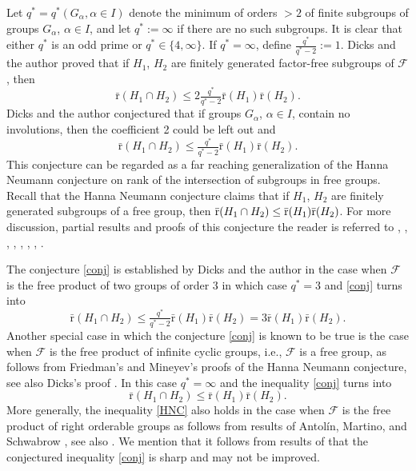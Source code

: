 \documentclass[10pt, reqno]{amsart}
\numberwithin{equation}{section}
\begin{document}
Let $q^*= q^*(G_{\alpha}, {\alpha} \in I)$ denote the minimum of orders $>2$ of finite subgroups of groups $G_{\alpha}$, ${\alpha}
\in I$, and  let $q^* := \infty$ if there are no such subgroups.  It is clear that either $q^*$ is an odd prime or $q^* \in \{ 4,  \infty \}$.
If  $q^* = \infty$, define
$ \tfrac{q^*}{q^*-2} := 1$.
Dicks and the author \cite{DIv} proved that if
$H_1$, $H_2$ are finitely generated factor-free subgroups of  ${\mathcal{F}}$,  then
\begin{equation}\label{di}
\bar {\mathrm{r}}(H_1\cap H_2)  \le  2\tfrac{q^*}{q^*-2}
 \bar {\mathrm{r}}(H_1) \bar {\mathrm{r}}(H_2)  .
\end{equation}
Dicks and the author \cite{DIv} conjectured that if groups $G_{\alpha}$, ${\alpha} \in I$,  contain no involutions, then the coefficient 2 could be left out  and
 \begin{equation}\label{conj}
 \bar {\mathrm{r}}(H_1\cap H_2)  \le  \tfrac{q^*}{q^*-2}
 \bar {\mathrm{r}}(H_1) \bar {\mathrm{r}}(H_2)  .
 \end{equation}
This conjecture  can be regarded as a far reaching generalization of the Hanna Neumann conjecture  \cite{N1} on rank of the intersection of subgroups in free groups.  Recall that the  Hanna Neumann conjecture  \cite{N1}   claims that  if  $H_1$, $H_2$
are finitely generated subgroups of a free group, then $\bar { \rm{r} } (H_1 \cap H_2) \le \bar{ {\rm r}} (H_1) \bar { \rm r}  (H_2)$.
For more discussion, partial results and proofs of this conjecture the reader is referred to  \cite{D}, \cite{D2}, \cite{Fr}, \cite{Iv12}, \cite{Min},  \cite{N2}, \cite{St}, \cite{T}.

The conjecture \eqref{conj} is established by Dicks and the author \cite{DIv2} in the case when ${\mathcal{F}}$  is the free product of two groups of order 3 in which case $q^* = 3$ and \eqref{conj} turns into
$$
\bar {\mathrm{r}}(H_1\cap H_2)  \le  \tfrac{q^*}{q^*-2}  \bar {\mathrm{r}}(H_1) \bar {\mathrm{r}}(H_2) = 3  \bar {\mathrm{r}}(H_1) \bar {\mathrm{r}}(H_2) .
$$
Another special case in which the conjecture \eqref{conj} is known to be true is the case when ${\mathcal{F}}$ is the free product of infinite cyclic groups, i.e., ${\mathcal{F}}$ is a free group, as follows from Friedman's \cite{Fr}  and Mineyev's \cite{Min} proofs  of the Hanna Neumann conjecture, see also Dicks's proof \cite{D2}.  In this case  $q^* =\infty$ and the inequality \eqref{conj} turns into
\begin{equation}\label{HNC}
\bar {\mathrm{r}}(H_1\cap H_2)  \le   \bar {\mathrm{r}}(H_1) \bar {\mathrm{r}}(H_2) .
 \end{equation}
More generally, the inequality \eqref{HNC}  also holds in the case when ${\mathcal{F}}$ is the free product  of right  orderable groups as follows from results of  Antol\'in, Martino, and Schwabrow \cite{ABC}, see also \cite{Iv12}.
We mention that it follows from results of \cite{DIv}  that the conjectured inequality  \eqref{conj}  is sharp and may not be improved.
\end{document}
